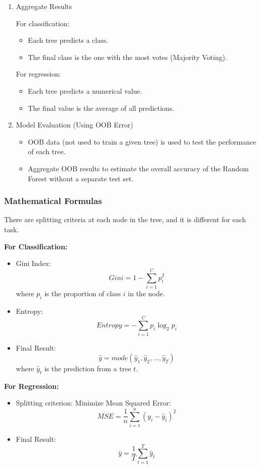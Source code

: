 \begin{enumerate}[label=Step \arabic*:, align=left, leftmargin=20pt,labelsep=1em]
    \item Aggregate Results

    \smallskip
    For classification:
    \begin{itemize}
        \item Each tree predicts a class.
        \item The final class is the one with the most votes (Majority Voting).
    \end{itemize}

    \smallskip
    For regression:
    \begin{itemize}
        \item Each tree predicts a numerical value.
        \item The final value is the average of all predictions.
    \end{itemize}

    \item Model Evaluation (Using OOB Error)
    \begin{itemize}
        \item OOB data (not used to train a given tree) is used to test the performance of each tree.
        \item Aggregate OOB results to estimate the overall accuracy of the Random Forest without a separate test set.
    \end{itemize}
\end{enumerate}

\smallskip

\subsubsection{Mathematical Formulas}\text{}

There are splitting criteria at each node in the tree, and it is different for each task.

\textbf{For Classification:}
\begin{itemize}
    \item Gini Index:
    \[Gini = 1 - \sum_{i=1}^C{p_i^2}\]
    where $p_i$ is the proportion of class $i$ in the node.
    \item Entropy:
    \[Entropy = - \sum_{i=1}^C{p_i \log_2{p_i}}\]
    \item Final Result:
    \[\hat{y} = mode(\hat{y}_1, \hat{y}_2, \ldots, \hat{y}_T)\]
    where $\hat{y}_t$ is the prediction from a tree $t$.
\end{itemize}

\textbf{For Regression:}
\begin{itemize}
    \item Splitting criterion: Minimize Mean Squared Error:
    \[MSE = \frac{1}{n} \sum_{i=1}^n{(y_i - \hat{y}_i)^2}\]
    \item Final Result:
    \[\hat{y} = \frac{1}{T} \sum_{t=1}^T{\hat{y}_t}\]
\end{itemize}

